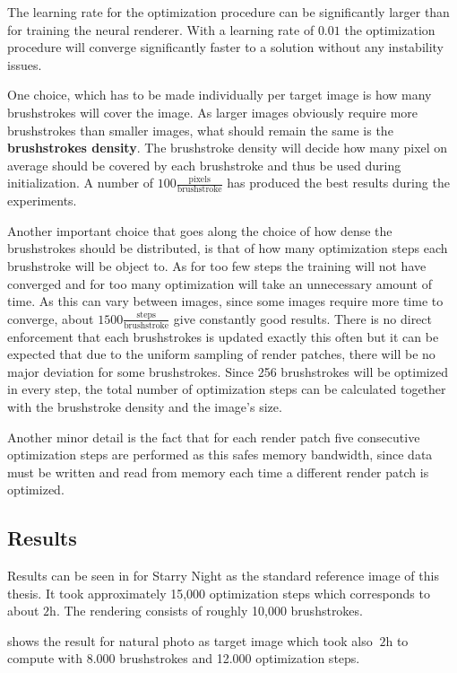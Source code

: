 The learning rate for the optimization procedure can be significantly larger than for training the neural renderer.
With a learning rate of $0.01$ the optimization procedure will converge significantly faster to a solution without any instability issues.

One choice, which has to be made individually per target image is how many brushstrokes will cover the image.
As larger images obviously require more brushstrokes than smaller images, what should remain the same is the \textbf{brushstrokes density}.
The brushstroke density will decide how many pixel on average should be covered by each brushstroke and thus be used during initialization.
A number of $100 \frac{\text{pixels}}{\text{brushstroke}}$ has produced the best results during the experiments.

Another important choice that goes along the choice of how dense the brushstrokes should be distributed, is that of how many optimization steps each brushstroke will be object to.
As for too few steps the training will not have converged and for too many optimization will take an unnecessary amount of time.
As this can vary between images, since some images require more time to converge, about $1500 \frac{\text{steps}}{\text{brushstroke}}$ give constantly good results.
There is no direct enforcement that each brushstrokes is updated exactly this often but it can be expected that due to the uniform sampling of render patches, there will be no major deviation for some brushstrokes.
Since 256 brushstrokes will be optimized in every step, the total number of optimization steps can be calculated together with the brushstroke density and the image's size.

Another minor detail is the fact that for each render patch five consecutive optimization steps are performed as this safes memory bandwidth, since data must be written and read from memory each time a different render patch is optimized.

\subsection{Results}

Results can be seen in  for Starry Night as the standard reference image of this thesis.
It took approximately 15,000 optimization steps which corresponds to about $2\si{\hour}$.
The rendering consists of roughly 10,000 brushstrokes.

 shows the result for natural photo as target image which took
also $~2\si{\hour}$ to compute with 8.000 brushstrokes and 12.000 optimization steps.
